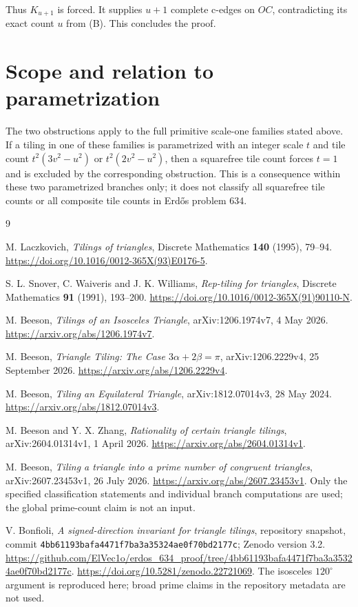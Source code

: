 \documentclass[
  11pt,
  a4paper,
]{article}
\begin{document}
Thus \(K_{u+1}\) is forced. It supplies \(u+1\) complete c-edges on
\(OC\), contradicting its exact count \(u\) from (B). This concludes the
proof.

\hypertarget{scope-and-relation-to-parametrization}{%
\section*{Scope and relation to parametrization}\label{scope-and-relation-to-parametrization}}

The two obstructions apply to the full primitive scale-one families
stated above. If a tiling in one of these families is parametrized with
an integer scale \(t\) and tile count \(t^2(3v^2-u^2)\) or
\(t^2(2v^2-u^2)\), then a squarefree tile count forces \(t=1\) and is
excluded by the corresponding obstruction. This is a consequence within
these two parametrized branches only; it does not classify all
squarefree tile counts or all composite tile counts in Erdős problem
634.

\clearpage
\begin{thebibliography}{9}

M. Laczkovich, \emph{Tilings of triangles}, Discrete Mathematics
\textbf{140} (1995), 79--94.
\url{https://doi.org/10.1016/0012-365X(93)E0176-5}.

S. L. Snover, C. Waiveris and J. K. Williams,
\emph{Rep-tiling for triangles}, Discrete Mathematics
\textbf{91} (1991), 193--200.
\url{https://doi.org/10.1016/0012-365X(91)90110-N}.

M. Beeson, \emph{Tilings of an Isosceles Triangle},
arXiv:1206.1974v7, 4 May 2026.
\url{https://arxiv.org/abs/1206.1974v7}.

M. Beeson, \emph{Triangle Tiling: The Case $3\alpha+2\beta=\pi$},
arXiv:1206.2229v4, 25 September 2026.
\url{https://arxiv.org/abs/1206.2229v4}.

M. Beeson, \emph{Tiling an Equilateral Triangle},
arXiv:1812.07014v3, 28 May 2024.
\url{https://arxiv.org/abs/1812.07014v3}.

M. Beeson and Y. X. Zhang, \emph{Rationality of certain triangle
tilings}, arXiv:2604.01314v1, 1 April 2026.
\url{https://arxiv.org/abs/2604.01314v1}.

M. Beeson, \emph{Tiling a triangle into a prime number of congruent
triangles}, arXiv:2607.23453v1, 26 July 2026.
\url{https://arxiv.org/abs/2607.23453v1}.
Only the specified classification statements and individual branch
computations are used; the global prime-count claim is not an input.

V. Bonfioli, \emph{A signed-direction invariant for triangle tilings},
repository snapshot, commit
\texttt{4bb61193bafa4471f7ba3a35324ae0f70bd2177c};
Zenodo version 3.2.
\url{https://github.com/ElVec1o/erdos_634_proof/tree/4bb61193bafa4471f7ba3a35324ae0f70bd2177c}.
\url{https://doi.org/10.5281/zenodo.22721069}.
The isosceles $120^\circ$ argument is reproduced here; broad prime
claims in the repository metadata are not used.

\end{thebibliography}
\end{document}
